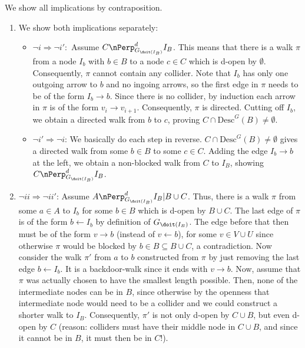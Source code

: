 \begin{enumerate}
  \begin{ungradedsolution}
    We show all implications by contraposition.
    \begin{enumerate}
      \item We show both implications separately:
      \begin{itemize}
        \item $\neg i \Rightarrow \neg i':$ Assume $C \nPerp^d_{G_{\doit(I_B)}} I_B$.
        This means that there is a walk $\pi$ from a node $I_b$ with $b \in B$ to a node $c \in C$ which is d-open by $\emptyset$.
        Consequently, $\pi$ cannot contain any collider.
        Note that $I_b$ has only one outgoing arrow to $b$ and no ingoing arrows, so the first edge in $\pi$ needs to be of the form $I_b \to b$.
        Since there is no collider, by induction each arrow in $\pi$ is of the form $v_i \rightarrow v_{i+1}$.
        Consequently, $\pi$ is directed.
        Cutting off $I_b$, we obtain a directed walk from $b$ to $c$, proving $C \cap \text{Desc}^G(B) \neq \emptyset$.
        \item $\neg i' \Rightarrow \neg i$: We basically do each step in reverse.
        $C \cap \text{Desc}^G(B) \neq \emptyset$ gives a directed walk from some $b \in B$ to some $c \in C$.
        Adding the edge $I_b \to b$ at the left, we obtain a non-blocked walk from $C$ to $I_B$, showing $C \nPerp^d_{G_{\doit(I_B)}} I_B$.
      \end{itemize}
      \item $\neg ii \Rightarrow \neg ii'$: Assume $A \nPerp^d_{G_{\doit(I_B)}} I_B | B \cup C$.
      Thus, there is a walk $\pi$ from some $a \in A$ to $I_b$ for some $b \in B$ which is d-open by $B \cup C$.
      The last edge of $\pi$ is of the form $b \leftarrow I_b$ by definition of $G_{\doit(I_B)}$.
      The edge before that then must be of the form $v \rightarrow b$ (instead of $v \leftarrow b$), for some $v \in V \cup U$ since otherwise $\pi$ would be blocked by $b \in B \subseteq B \cup C$, a contradiction.
      Now consider the walk $\pi'$ from $a$ to $b$ constructed from $\pi$ by just removing the last edge $b \leftarrow I_b$.
      It is a backdoor-walk since it ends with $v \rightarrow b$.
      Now, assume that $\pi$ was actually chosen to have the smallest length possible.
      Then, none of the intermediate nodes can be in $B$, since otherwise by the openness that intermediate node would need to be a collider and we could construct a shorter walk to $I_B$.
      Consequently, $\pi'$ is not only d-open by $C \cup B$, but even d-open by $C$ (reason: colliders must have their middle node in $C \cup B$, and since it cannot be in $B$, it must then be in $C$!).

\end{enumerate}
\end{ungradedsolution}
\end{enumerate}
